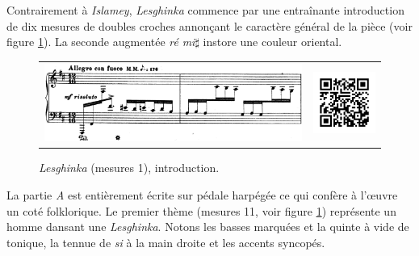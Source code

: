 Contrairement à \emph{Islamey}, \emph{Lesghinka} commence par une entraînante introduction de dix mesures de doubles croches annonçant le caractère général de la pièce (voir figure \ref{lesghinka-1}). La seconde augmentée \emph{ré} \emph{mi}$\sharp$ instore une couleur oriental.

\begin{figure}[!ht]
  \begin{bigcenter}
    \vspace*{0.25cm}
    \begin{tabular}{lr}
      \includegraphics[width=12.5cm, keepaspectratio]{lesghinka-intro.png}
      &
      \includegraphics[width=3cm, keepaspectratio]{op11-qr.png}
    \end{tabular}
  \end{bigcenter}
  \caption{\label{lesghinka-1}\emph{Lesghinka} (mesures 1), introduction.}
\end{figure}

La partie \emph{A} est entièrement écrite sur pédale harpégée ce qui confère à l'œuvre un coté folklorique. Le premier thème (mesures 11, voir figure \ref{lesghinka-1}) représente un homme dansant une \emph{Lesghinka}. Notons les basses marquées et la quinte à vide de tonique, la tennue de \emph{si} à la main droite et les accents syncopés.

